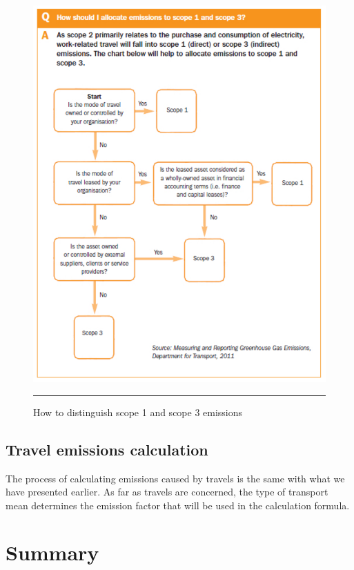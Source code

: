 \begin{figure}[htbp]
	\centering
		\includegraphics[scale=0.85]{./Figures/chapter2/figure17.pdf}
		\rule{35em}{0.5pt}
	\caption[Seperating Scope 1 and Scope 3 Emissions]{How to distinguish scope 1 and scope 3 emissions\cite{reference24}}
	\label{fig:scope1Scope3}
\end{figure}


\subsection{Travel emissions calculation}

The process of calculating emissions caused by travels is the same with what we have presented earlier. As far as travels are concerned, the type of transport mean determines the emission factor that will be used in the calculation formula.


\section{Summary}
